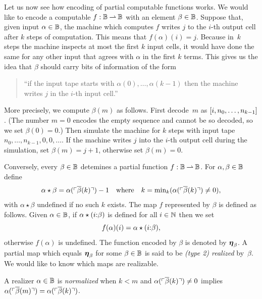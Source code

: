Let us now see how encoding of partial computable functions works. We
would like to encode a computable $f : \mathbb{B} \mathbin{\rightharpoonup} \mathbb{B}$ with an
element $\beta \in \mathbb{B}$. Suppose that, given input $\alpha \in
\mathbb{B}$, the machine which computes $f$ writes $j$ to the $i$-th
output cell after $k$ steps of computation. This means that
$f(\alpha)(i) = j$. Because in~$k$ steps the machine inspects at most
the first $k$ input cells, it would have done the same for any other
input that agrees with $\alpha$ in the first $k$ terms. This gives us
the idea that $\beta$ should carry bits of information of the form
%
\begin{quote}
  ``if the input tape starts with $\alpha(0), \ldots,
  \alpha(k-1)$ then the machine writes $j$ in the $i$-th input
  cell.''
\end{quote}
%
More precisely, we compute $\beta(m)$ as follows. First decode~$m$ as
$[i, n_0, \ldots, n_{k-1}]$. (The number $m = 0$ encodes the empty
sequence and cannot be so decoded, so we set $\beta(0) = 0$.) Then
simulate the machine for $k$ steps with input tape $n_0, \ldots,
n_{k-1}, 0, 0, \ldots$. If the machine writes $j$ into the $i$-th
output cell during the simulation, set $\beta(m) = j + 1$, otherwise
set $\beta(m) = 0$.

Conversely, every $\beta \in \mathbb{B}$ detemines a partial function $f :
\mathbb{B} \mathbin{\rightharpoonup} \mathbb{B}$. For $\alpha, \beta \in \mathbb{B}$ define
%
\begin{equation*}
  \alpha \star \beta = \alpha(\ulcorner \overline{\beta}(k) \urcorner) - 1
  \quad\text{where}\quad
  k = \min\nolimits_k (\alpha(\ulcorner \overline{\beta}(k) \urcorner) \neq 0),
\end{equation*}
%
with $\alpha \star \beta$ undefined if no such $k$ exists. The map $f$
represented by $\beta$ is defined as follows. Given $\alpha \in
\mathbb{B}$, if $\alpha \star
(i {:} \beta)$ is defined for all $i \in \mathbb{N}$ then we set
%
\begin{equation}
  \label{eq:type2-encoding}
  f(\alpha)(i) = \alpha \star (i {:} \beta),
\end{equation}
%
otherwise $f(\alpha)$ is undefined. The function encoded by $\beta$ is
denoted by $\text{\boldmath{$\eta$}}_\beta$. A partial map which equals $\text{\boldmath{$\eta$}}_\beta$ for
some $\beta \in \mathbb{B}$ is said to be \emph{(type 2) realized}
by~$\beta$. We would like to know which maps are realizable.

\begin{definition}
  \label{def:normalized-BB}%
  A realizer $\alpha \in \mathbb{B}$ is \emph{normalized} when $k < m$ and
  $\alpha(\ulcorner \overline{\beta}(k) \urcorner) \neq 0$ implies
  $\alpha(\ulcorner \overline{\beta}(m) \urcorner) = \alpha(\ulcorner \overline{\beta}(k) \urcorner)$.
\end{definition}

